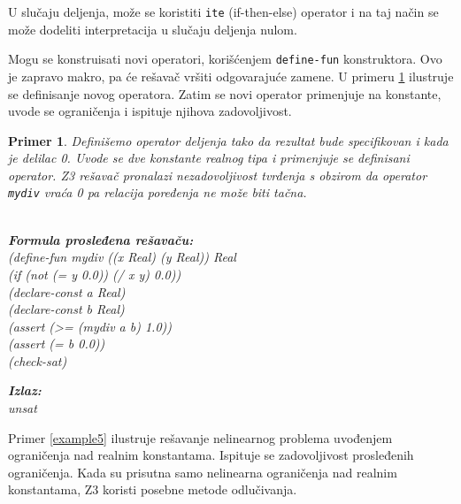 \documentclass[12pt,oneside]{memoir}
\newcommand\tab[1][0.5cm]{\hspace*{#1}}
\newtheorem{primer}{Primer}
\begin{document}
U slučaju deljenja, može se koristiti \texttt{ite} (if-then-else) operator i na taj način se može dodeliti interpretacija u slučaju deljenja nulom.
\par
Mogu se konstruisati novi operatori, korišćenjem \texttt{define-fun} konstruktora. Ovo je zapravo makro, pa će rešavač vršiti odgovarajuće zamene. U primeru \ref{example4} ilustruje se definisanje novog operatora. Zatim se novi operator primenjuje na konstante, uvode se ograničenja i ispituje njihova zadovoljivost.
\begin{primer} \label{example4}
Definišemo operator deljenja tako da rezultat bude specifikovan i kada je delilac 0. Uvode se dve konstante realnog tipa i primenjuje se definisani operator. Z3 rešavač pronalazi nezadovoljivost tvrđenja s obzirom da operator \texttt{mydiv} vraća 0 pa relacija poređenja ne može biti tačna.\\ \\
\begin{minipage}[b]{0.5\textwidth}
\textbf{Formula prosleđena rešavaču:}
\\(define-fun mydiv ((x Real) (y Real)) Real
\\\tab (if (not (= y 0.0))  (/ x y)  0.0))
\\(declare-const a Real)
\\(declare-const b Real)
\\(assert (>= (mydiv a b) 1.0))
\\(assert (= b 0.0))
\\(check-sat)
\end{minipage}
\hspace{3cm}
\begin{minipage}[t]{0.4\textwidth}
\vspace{-4.73cm}
\textbf{Izlaz:}
\\unsat
\end{minipage}
\end{primer}
\par
Primer \ref{example5} ilustruje rešavanje nelinearnog problema uvođenjem ograničenja nad realnim konstantama. Ispituje se zadovoljivost prosleđenih ograničenja. Kada su prisutna samo nelinearna ograničenja nad realnim konstantama, Z3 koristi posebne metode odlučivanja.
\end{document}
